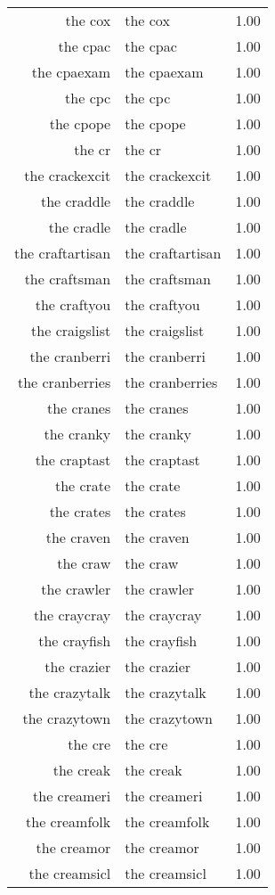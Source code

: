 \begin{table}[ht]
\begin{tabular}{rlr}
  the cox & the cox & 1.00 \\ 
  the cpac & the cpac & 1.00 \\ 
  the cpaexam & the cpaexam & 1.00 \\ 
  the cpc & the cpc & 1.00 \\ 
  the cpope & the cpope & 1.00 \\ 
  the cr & the cr & 1.00 \\ 
  the crackexcit & the crackexcit & 1.00 \\ 
  the craddle & the craddle & 1.00 \\ 
  the cradle & the cradle & 1.00 \\ 
  the craftartisan & the craftartisan & 1.00 \\ 
  the craftsman & the craftsman & 1.00 \\ 
  the craftyou & the craftyou & 1.00 \\ 
  the craigslist & the craigslist & 1.00 \\ 
  the cranberri & the cranberri & 1.00 \\ 
  the cranberries & the cranberries & 1.00 \\ 
  the cranes & the cranes & 1.00 \\ 
  the cranky & the cranky & 1.00 \\ 
  the craptast & the craptast & 1.00 \\ 
  the crate & the crate & 1.00 \\ 
  the crates & the crates & 1.00 \\ 
  the craven & the craven & 1.00 \\ 
  the craw & the craw & 1.00 \\ 
  the crawler & the crawler & 1.00 \\ 
  the craycray & the craycray & 1.00 \\ 
  the crayfish & the crayfish & 1.00 \\ 
  the crazier & the crazier & 1.00 \\ 
  the crazytalk & the crazytalk & 1.00 \\ 
  the crazytown & the crazytown & 1.00 \\ 
  the cre & the cre & 1.00 \\ 
  the creak & the creak & 1.00 \\ 
  the creameri & the creameri & 1.00 \\ 
  the creamfolk & the creamfolk & 1.00 \\ 
  the creamor & the creamor & 1.00 \\ 
  the creamsicl & the creamsicl & 1.00 \\ 

\end{tabular}
\end{table}
